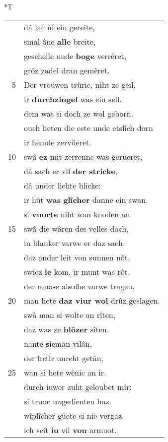\documentclass[8pt,a4paper,notitlepage]{article}
\begin{document}
\begin{table}[ht]
\begin{minipage}[t]{0.5\linewidth}
\end{minipage}
\hspace{0.5cm}
\begin{minipage}[t]{0.5\linewidth}
\small
\begin{center}*T
\end{center}
\begin{tabular}{rl}
 & dâ lac ûf ein gereite,\\ 
 & smal âne \textbf{alle} breite,\\ 
 & geschelle unde \textbf{boge} verrêret,\\ 
 & grôz zadel dran gemêret.\\ 
5 & Der vrouwen trûric, niht ze geil,\\ 
 & ir \textbf{durchzingel} was ein seil.\\ 
 & dem was si doch ze wol geborn.\\ 
 & ouch heten die este unde etslîch dorn\\ 
 & ir hemde zervüeret.\\ 
10 & swâ \textbf{ez} mit zerrenne was gerüeret,\\ 
 & dâ sach er vil \textbf{der stricke},\\ 
 & dâ under liehte blicke:\\ 
 & ir hût \textbf{was} \textbf{glîcher} danne ein swan.\\ 
 & si \textbf{vuorte} niht wan knoden an.\\ 
15 & swâ die wâren des velles dach,\\ 
 & in blanker varwe er daz sach.\\ 
 & daz ander leit von sunnen nôt.\\ 
 & swiez \textbf{ie} kom, ir munt was rôt.\\ 
 & der muose also\textit{l}he varwe tragen,\\ 
20 & man hete \textbf{daz viur wol} drûz geslagen.\\ 
 & swâ man si wolte an rîten,\\ 
 & daz was ze \textbf{blôzer} sîten.\\ 
 & nante \textbf{s}ieman vilân,\\ 
 & der h\textit{e}tir unreht getân,\\ 
25 & wan si hete wênic an ir.\\ 
 & durch iuwer zuht geloubet mir:\\ 
 & si truoc u\textit{n}gedienten haz.\\ 
 & wîplîcher güete si nie vergaz.\\ 
 & ich seit \textbf{iu} vil \textbf{von} armuot.\\ 

\end{tabular}
\end{minipage}
\end{table}
\end{document}
